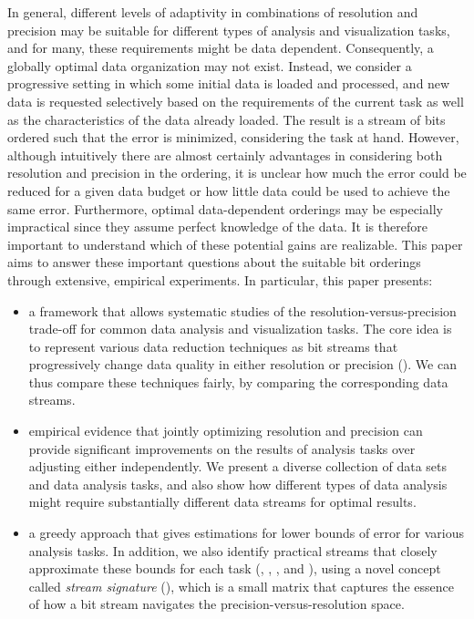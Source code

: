 In general, different levels of adaptivity in combinations of resolution and precision may be
suitable for different types of analysis and visualization tasks, and for many, these requirements
might be data dependent. Consequently, a globally optimal data organization may not exist. Instead,
we consider a progressive setting in which some initial data is loaded and processed, and new data
is requested selectively based on the requirements of the current task as well as the characteristics
of the data already loaded. The result is a stream of bits ordered such that the error is minimized,
considering the task at hand. However, although intuitively there are almost certainly advantages in
considering both resolution and precision in the ordering, it is unclear how much the error could be
reduced for a given data budget or how little data could be used to achieve the same error.
Furthermore, optimal data-dependent orderings may be especially impractical since they assume
perfect knowledge of the data. It is therefore important to understand which of these potential
gains are realizable. This paper aims to answer these important questions about the suitable bit
orderings through extensive, empirical experiments. In particular, this paper presents:

\begin{itemize}\dense
%
\item a framework that allows systematic studies of the resolution-versus-precision trade-off for
common data analysis and visualization tasks. The core idea is to represent various data reduction
techniques as bit streams that progressively change data quality in either resolution or precision %
(). We can thus compare these techniques fairly, by comparing the
corresponding data streams.
%  
\item empirical evidence that jointly optimizing resolution and precision can provide significant
improvements on the results of analysis tasks over adjusting either independently. 
We present a diverse collection of data sets and data analysis tasks, and also show how
different types of data analysis might require substantially different data streams for optimal
results.
%
\item a greedy approach that gives estimations for lower bounds of error for various analysis tasks.
In addition, we also identify practical streams that closely approximate these bounds for each task
(, , , and
), using a novel concept called \emph{stream signature}
(), which is a small matrix that captures the essence of how a bit stream
navigates the precision-versus-resolution space.
\end{itemize}

